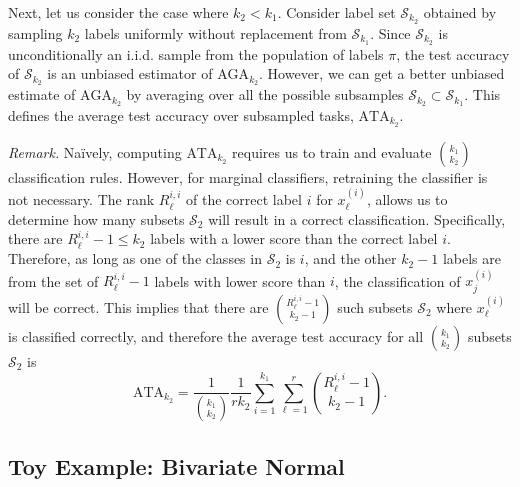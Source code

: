 \documentclass[twoside,11pt]{article}
\begin{document}
Next, let us consider the case where $k_2 < k_1$.  Consider label set
$\mathcal{S}_{k_2}$ obtained by sampling $k_2$ labels uniformly
without replacement from $\mathcal{S}_{k_1}$. Since
$\mathcal{S}_{k_2}$ is unconditionally an i.i.d. sample from the
population of labels $\pi$, the test accuracy of $\mathcal{S}_{k_2}$
is an unbiased estimator of $\text{AGA}_{k_2}$.  However, we can get a
better unbiased estimate of $\text{AGA}_{k_2}$ by averaging over all
the possible subsamples $\mathcal{S}_{k_2} \subset \mathcal{S}_{k_1}$.
This defines the average test accuracy over subsampled tasks,
$\text{ATA}_{k_2}$.

\emph{Remark.}  Na\"{i}vely, computing $\text{ATA}_{k_2}$ requires us
to train and evaluate ${k_1}\choose{k_2}$ classification rules.
However, for marginal classifiers, retraining the classifier is not
necessary.  The rank $R_{\ell}^{i,i}$ of the correct label $i$
for $x_\ell^{(i)}$, allows us to determine how many subsets
$\mathcal{S}_2$ will result in a correct classification. Specifically,
there are $R_{\ell}^{i,i} - 1 \leq k_2$ labels with a lower score than the correct
label $i$.  Therefore, as long as one of the classes in
$\mathcal{S}_2$ is $i$, and the other $k_2-1$ labels are from the set
of $R_{\ell}^{i,i}-1$ labels with lower score than $i$, the
classification of $x_j^{(i)}$ will be correct.  This implies that
there are ${R_{\ell}^{i,i}-1}\choose{k_2-1}$ such subsets $\mathcal{S}_2$
where $x_\ell^{(i)}$ is classified correctly, and therefore the average
test accuracy for all ${k_1}\choose{k_2}$ subsets $\mathcal{S}_2$ is
\begin{equation}\label{eq:avtestrisk}
\text{ATA}_{k_2} = \frac{1}{{{k_1}\choose{k_2}}}\frac{1}{r k_2} \sum_{i=1}^{k_1} \sum_{\ell=1}^{r} {{R_{\ell}^{i,i}-1}\choose{k_2-1}}.
\end{equation}

\subsection{Toy Example: Bivariate Normal}
\label{sec:toyExA}
\end{document}
